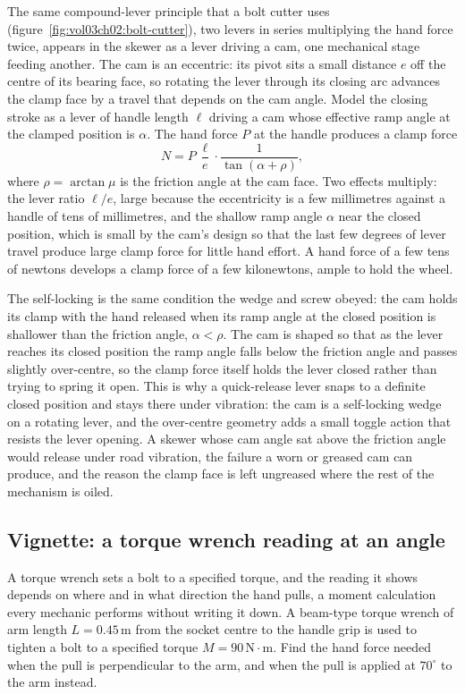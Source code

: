 The same compound-lever principle that a bolt cutter uses
(figure~\ref{fig:vol03ch02:bolt-cutter}), two levers in series multiplying
the hand force twice, appears in the skewer as a lever driving a cam, one
mechanical stage feeding another. The cam is an eccentric: its pivot sits a
small distance $e$ off the centre
of its bearing face, so rotating the lever through its closing arc advances
the clamp face by a travel that depends on the cam angle. Model the closing
stroke as a lever of handle length $\ell$ driving a cam whose effective
ramp angle at the clamped position is $\alpha$. The hand force $P$ at the
handle produces a clamp force
\[
N = P\,\frac{\ell}{e}\cdot\frac{1}{\tan(\alpha + \rho)},
\]
where $\rho = \arctan\mu$ is the friction angle at the cam face. Two effects
multiply: the lever ratio $\ell/e$, large because the eccentricity is a few
millimetres against a handle of tens of millimetres, and the shallow ramp
angle $\alpha$ near the closed position, which is small by the cam's design
so that the last few degrees of lever travel produce large clamp force for
little hand effort. A hand force of a few tens of newtons develops a clamp
force of a few kilonewtons, ample to hold the wheel.

The self-locking is the same condition the wedge and screw obeyed: the cam
holds its clamp with the hand released when its ramp angle at the closed
position is shallower than the friction angle, $\alpha < \rho$. The cam is
shaped so that as the lever reaches its closed position the ramp angle falls
below the friction angle and passes slightly over-centre, so the clamp force
itself holds the lever closed rather than trying to spring it open. This is
why a quick-release lever snaps to a definite closed position and stays
there under vibration: the cam is a self-locking wedge on a rotating lever,
and the over-centre geometry adds a small toggle action that resists the
lever opening. A skewer whose cam angle sat above the friction angle would
release under road vibration, the failure a worn or greased cam can produce,
and the reason the clamp face is left ungreased where the rest of the
mechanism is oiled.

\subsection{Vignette: a torque wrench reading at an angle}

A torque wrench sets a bolt to a specified torque, and the reading it shows
depends on where and in what direction the hand pulls, a moment calculation
every mechanic performs without writing it down. A beam-type torque wrench
of arm length $L = 0.45\,\si{\meter}$ from the socket centre to the handle
grip is used to tighten a bolt to a specified torque
$M = 90\,\text{N}\cdot\text{m}$. Find the hand force needed when the pull is
perpendicular to the arm, and when the pull is applied at $70^\circ$ to the
arm instead.

